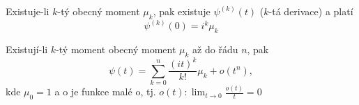 \begin{theorem}
Existuje-li $k$-tý obecný moment $\mu_k$, pak existuje $\psi^{(k)}(t)$ ($k$-tá derivace) a platí \begin{equation}
\psi^{(k)}(0)=i^k\mu_k
\end{equation}
\end{theorem}

\begin{dusledek}
Existují-li $k$-tý moment obecný moment $\mu_k$ až do řádu $n$, pak
\begin{equation}
\psi(t)=\sum_{k=0}^{n}\frac{(it)^k}{k!} \mu_k+o(t^n),
\end{equation}
kde $\mu_0=1$ a o je funkce malé o, tj. $o(t):\lim_{t\rightarrow 0}\frac{o(t)}{t}=0$
\end{dusledek}
